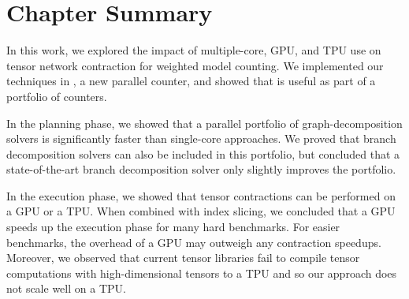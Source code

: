 \section{Chapter Summary}
In this work, we explored the impact of multiple-core, GPU, and TPU use on tensor network contraction for weighted model counting. We implemented our techniques in , a new parallel counter, and showed that  is useful as part of a portfolio of counters.

In the planning phase, we showed that a parallel portfolio of graph-decomposition solvers is significantly faster than single-core approaches. We proved that branch decomposition solvers can also be included in this portfolio, but concluded that a state-of-the-art branch decomposition solver only slightly improves the portfolio. 

In the execution phase, we showed that tensor contractions can be performed on a GPU or a TPU. When combined with index slicing, we concluded that a GPU speeds up the execution phase for many hard benchmarks. For easier benchmarks, the overhead of a GPU may outweigh any contraction speedups. 
Moreover, we observed that current tensor libraries fail to compile tensor computations with high-dimensional tensors to a TPU and so our approach does not scale well on a TPU.
